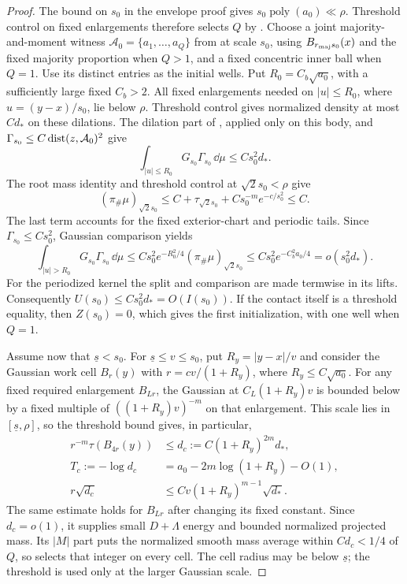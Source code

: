 \begin{proof}
The bound on \(s_0\) in the envelope proof gives
\(s_0\operatorname{poly}(a_0)\ll\rho\). Threshold control on fixed
enlargements therefore selects \(Q\) by . Choose a
joint majority-and-moment witness
\(\mathcal A_0=\{a_1,\ldots,a_Q\}\) from  at scale
\(s_0\), using \(B_{r_{\rm maj}s_0}(x)\) and the fixed majority
proportion when \(Q>1\), and a fixed concentric inner ball when
\(Q=1\). Use its distinct entries as the initial wells. Put
\(R_0=C_b\sqrt{a_0}\), with a sufficiently large fixed \(C_b>2\).
All fixed enlargements
needed on \(|u|\le R_0\), where \(u=(y-x)/s_0\), lie below \(\rho\).
Threshold control gives normalized density at most \(Cd_*\) on these
dilations. The dilation part of , applied only
on this body, and
\(\Gamma_{s_0}\le C\operatorname{dist}(z,\mathcal A_0)^2\) give
\[
 \int_{|u|\le R_0}G_{s_0}\Gamma_{s_0}\,\dd\mu
 \le Cs_0^2d_*.
\]
The root mass identity and threshold control at \(\sqrt2s_0<\rho\)
give
\[
 (\pi_\#\mu)_{\sqrt2s_0}
 \le C+\tau_{\sqrt2s_0}
       +Cs_0^{-m}e^{-c/s_0^2}\le C.
\]
The last term accounts for the fixed exterior-chart and periodic
tails. Since \(\Gamma_{s_0}\le Cs_0^2\), Gaussian comparison yields
\[
 \int_{|u|>R_0}G_{s_0}\Gamma_{s_0}\,\dd\mu
 \le Cs_0^2e^{-R_0^2/4}(\pi_\#\mu)_{\sqrt2s_0}
 \le Cs_0^2e^{-C_b^2a_0/4}=o(s_0^2d_*).
\]
For the periodized kernel the split and comparison are made termwise
in its lifts. Consequently
\(U(s_0)\le Cs_0^2d_*=O(I(s_0))\).
If the contact itself is a threshold equality, then
\(Z(s_0)=0\), which gives the first initialization, with one well
when \(Q=1\).

Assume now that \(\underline s<s_0\). For
\(\underline s\le v\le s_0\), put \(R_y=|y-x|/v\) and consider the
Gaussian work cell \(B_r(y)\) with \(r=cv/(1+R_y)\), where
\(R_y\le C\sqrt{a_0}\). For any fixed required enlargement \(B_{Lr}\),
the Gaussian at \(C_L(1+R_y)v\) is bounded below by a fixed multiple
of \(((1+R_y)v)^{-m}\) on that enlargement. This scale lies in
\([\underline s,\rho]\), so the threshold bound gives, in particular,
\begin{equation}
 \begin{split}
 r^{-m}\tau(B_{4r}(y))&\le d_c:=C(1+R_y)^{2m}d_*,\\
 T_c:=-\log d_c&=a_0-2m\log(1+R_y)-O(1),\\
 r\sqrt{d_c}&\le Cv(1+R_y)^{m-1}\sqrt{d_*}.
 \end{split}
 \label{ex:threshold-cells}
\end{equation}
The same estimate holds for \(B_{Lr}\) after changing its fixed
constant. Since \(d_c=o(1)\), it supplies small \(D+\Lambda\)
energy and bounded normalized projected mass. Its \(|M|\) part puts
the normalized smooth mass average within \(Cd_c<1/4\) of \(Q\),
so  selects that integer on every cell. The cell
radius may be below \(\underline s\); the threshold is used only at
the larger Gaussian scale.


\end{proof}
